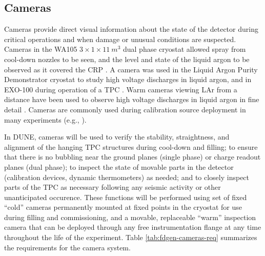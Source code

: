 \subsection{Cameras}
\label{sec:fdgen-slow-cryo-cameras}

Cameras provide direct visual information about the state of the
detector during critical operations and when damage or unusual
conditions are suspected.  Cameras in the WA105 \(3\times 1\times
  1\SI{1}{m^3}\) dual phase cryostat allowed spray from cool-down nozzles
to be seen, and the level and state of the liquid argon to be observed
as it covered the CRP \cite{Murphy:20170516}.  A camera was used in
the Liquid Argon Purity Demonstrator cryostat\cite{Adamowski:2014daa}
to study high voltage discharges in liquid argon, and in EXO-100
during operation of a TPC \cite{Delaquis:2013hva}.  Warm cameras
viewing LAr from a distance have been used to observe high voltage
discharges in liquid argon in fine detail \cite{Auger:2015xlo}.
Cameras are commonly used during calibration source deployment in
many experiments (e.g., \cite{Banks:2014hra}).

In DUNE, cameras will be used to verify the stability, straightness,
and alignment of the hanging TPC structures during cool-down and
filling; to ensure that there is no bubbling near the ground planes
(single phase) or charge readout planes (dual phase); to inspect the
state of movable parts in the detector (calibration devices, dynamic
thermometers) as needed; and to closely inspect parts of the TPC as
necessary following any seismic activity or other unanticipated
occurence.  These functions will be performed using set of fixed
``cold'' cameras permanently mounted at fixed points in the cryostat
for use during filling and commissioning, and a movable, replaceable
``warm'' inspection camera that can be deployed through any free
instrumentation flange at any time throughout the life of the
experiment.  Table \ref{tab:fdgen-cameras-req} summarizes the
requirements for the camera system.

